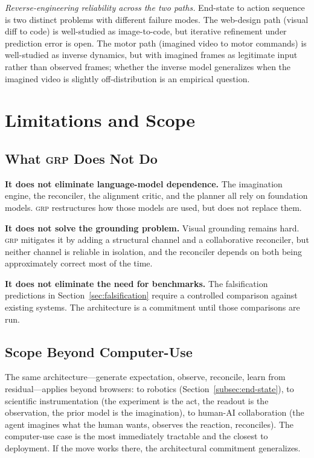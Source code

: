\documentclass[12pt]{article}
\theoremstyle{definition}
\theoremstyle{remark}
\newcommand{\grp}{\textsc{grp}}
\begin{document}
\begin{description}[leftmargin=*]
\item[\textbf{Q5.}] \emph{Reverse-engineering reliability across the
  two paths.} End-state to action sequence is two distinct problems
  with different failure modes. The web-design path (visual diff to
  code) is well-studied as image-to-code, but iterative refinement
  under prediction error is open. The motor path (imagined video to
  motor commands) is well-studied as inverse dynamics, but with
  imagined frames as legitimate input rather than observed frames;
  whether the inverse model generalizes when the imagined video is
  slightly off-distribution is an empirical question.
\end{description}

\section{Limitations and Scope}
\label{sec:limitations}

\subsection{What \grp{} Does Not Do}

\textbf{It does not eliminate language-model dependence.} The
imagination engine, the reconciler, the alignment critic, and the
planner all rely on foundation models. \grp{} restructures how those
models are used, but does not replace them.

\textbf{It does not solve the grounding problem.} Visual grounding
remains hard. \grp{} mitigates it by adding a structural channel and
a collaborative reconciler, but neither channel is reliable in
isolation, and the reconciler depends on both being approximately
correct most of the time.

\textbf{It does not eliminate the need for benchmarks.} The
falsification predictions in Section~\ref{sec:falsification} require
a controlled comparison against existing systems. The architecture is
a commitment until those comparisons are run.

\subsection{Scope Beyond Computer-Use}

The same architecture---generate expectation, observe, reconcile,
learn from residual---applies beyond browsers: to robotics
(Section~\ref{subsec:end-state}), to scientific instrumentation (the
experiment is the act, the readout is the observation, the prior
model is the imagination), to human-AI collaboration (the agent
imagines what the human wants, observes the reaction, reconciles).
The computer-use case is the most immediately tractable and the
closest to deployment. If the move works there, the architectural
commitment generalizes.
\end{document}
